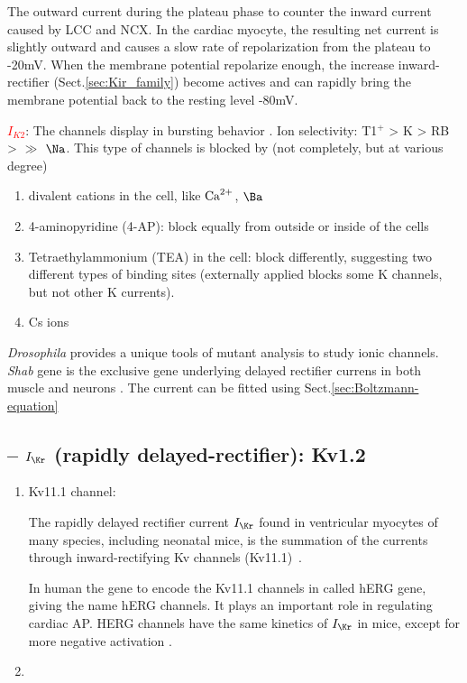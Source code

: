 The outward current during the plateau phase to counter the inward current
caused by LCC and NCX. In the cardiac myocyte, the resulting net current is
slightly outward and causes a slow rate of repolarization from the plateau to
-20mV. When the membrane potential repolarize enough, the increase
inward-rectifier (Sect.\ref{sec:Kir_family}) become actives and can rapidly
bring the membrane potential back to the resting level -80mV.

\textcolor{red}{$I_{K2}$}: The channels display in bursting behavior . Ion
selectivity: T1$^+$ > K > RB >  $\gg$ $\Na$. This type of channels
is blocked by (not completely, but at various degree)

\begin{enumerate}
\item divalent cations in the cell, like ${\text{Ca}^{2+}}$, $\Ba$
\item 4-aminopyridine (4-AP): block equally from outside or inside of
  the cells
\item Tetraethylammonium (TEA) in the cell: block differently, suggesting two
  different types of binding sites (externally applied blocks some K
  channels, but not other K currents). 
\item Cs ions
\end{enumerate}


\begin{framed}

{\it Drosophila} provides a unique tools of mutant analysis to study ionic
channels. {\it Shab} gene is the exclusive gene underlying delayed rectifier
currens in both muscle and neurons \citep{tsunoda1995}. 
The current can be fitted using Sect.\ref{sec:Boltzmann-equation}
\end{framed}

\subsection{-- $I_\Kr$ (rapidly delayed-rectifier): Kv1.2}
\label{sec:IKr_current}
\label{sec:Kv1.2}


\begin{enumerate}
  \item Kv11.1 channel: 

The rapidly delayed rectifier current $I_\Kr$ found in ventricular
myocytes of many species, including neonatal mice, is the
summation of the currents through inward-rectifying Kv channels
(Kv11.1)~\citep{mazhari2001,clancy2001,oehmen2002,fink2008}.

In human the gene to encode the Kv11.1 channels in called hERG gene, giving the
name hERG channels. It plays an important role in regulating cardiac AP. HERG
channels have the same kinetics of $I_\Kr$ in mice, except for more negative
activation \citep{liu2004}. 
  
  \item 
\end{enumerate}


